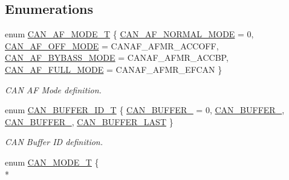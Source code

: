 \subsection*{Enumerations}
\begin{DoxyCompactItemize}
\item 
enum \hyperlink{group__CAN__17XX__40XX_gaf9abd01ef9ba38a2113a240871e9b48a}{C\+A\+N\+\_\+\+A\+F\+\_\+\+M\+O\+D\+E\+\_\+T} \{ \hyperlink{group__CAN__17XX__40XX_ggaf9abd01ef9ba38a2113a240871e9b48aa62b523726ff5237efa0e7fad638a5f04}{C\+A\+N\+\_\+\+A\+F\+\_\+\+N\+O\+R\+M\+A\+L\+\_\+\+M\+O\+DE} = 0, 
\hyperlink{group__CAN__17XX__40XX_ggaf9abd01ef9ba38a2113a240871e9b48aaecb73e4da7841519d8e59677d44e47cd}{C\+A\+N\+\_\+\+A\+F\+\_\+\+O\+F\+F\+\_\+\+M\+O\+DE} = C\+A\+N\+A\+F\+\_\+\+A\+F\+M\+R\+\_\+\+A\+C\+C\+O\+FF, 
\hyperlink{group__CAN__17XX__40XX_ggaf9abd01ef9ba38a2113a240871e9b48aa388c6b86ae9a41adbcdfb801401a9854}{C\+A\+N\+\_\+\+A\+F\+\_\+\+B\+Y\+B\+A\+S\+S\+\_\+\+M\+O\+DE} = C\+A\+N\+A\+F\+\_\+\+A\+F\+M\+R\+\_\+\+A\+C\+C\+BP, 
\hyperlink{group__CAN__17XX__40XX_ggaf9abd01ef9ba38a2113a240871e9b48aaaf64e87c0a985f362b46284932e44b45}{C\+A\+N\+\_\+\+A\+F\+\_\+\+F\+U\+L\+L\+\_\+\+M\+O\+DE} = C\+A\+N\+A\+F\+\_\+\+A\+F\+M\+R\+\_\+\+E\+F\+C\+AN
 \}\begin{DoxyCompactList}\small\item\em C\+AN AF Mode definition. \end{DoxyCompactList}
\item 
enum \hyperlink{group__CAN__17XX__40XX_ga073d4792bdf9dd0d8ceda6b8c3752dd9}{C\+A\+N\+\_\+\+B\+U\+F\+F\+E\+R\+\_\+\+I\+D\+\_\+T} \{ \hyperlink{group__CAN__17XX__40XX_gga073d4792bdf9dd0d8ceda6b8c3752dd9a4676dbb752485410e03d6b995983faf9}{C\+A\+N\+\_\+\+B\+U\+F\+F\+E\+R\+\_} = 0, 
\hyperlink{group__CAN__17XX__40XX_gga073d4792bdf9dd0d8ceda6b8c3752dd9a23a79343fe82a5c1b6b58d6c5cd5a656}{C\+A\+N\+\_\+\+B\+U\+F\+F\+E\+R\+\_}, 
\hyperlink{group__CAN__17XX__40XX_gga073d4792bdf9dd0d8ceda6b8c3752dd9a88d946b80f354f8d7dc216c017b9d1ce}{C\+A\+N\+\_\+\+B\+U\+F\+F\+E\+R\+\_}, 
\hyperlink{group__CAN__17XX__40XX_gga073d4792bdf9dd0d8ceda6b8c3752dd9a636fb6eb431d35079351e9ac16b3b8a8}{C\+A\+N\+\_\+\+B\+U\+F\+F\+E\+R\+\_\+\+L\+A\+ST}
 \}\begin{DoxyCompactList}\small\item\em C\+AN Buffer ID definition. \end{DoxyCompactList}
\item 
enum \hyperlink{group__CAN__17XX__40XX_ga57c03b9f9b4ebf86dccc13baf8c2889c}{C\+A\+N\+\_\+\+M\+O\+D\+E\+\_\+T} \{ \\*

\end{DoxyCompactItemize}
